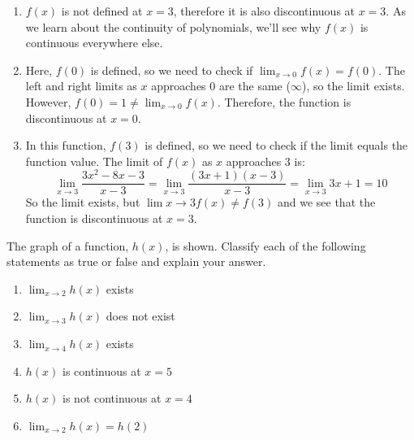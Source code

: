 \begin{Answer}[ref=limits5]
    \begin{enumerate}
    \item $f(x)$ is not defined at $x = 3$, therefore it is also discontinuous
     at $x = 3$. As we learn about the continuity of polynomials, we'll see 
     why $f(x)$ is continuous everywhere else. 
    \item Here, $f(0)$ is defined, so we need to check if $\lim_{x \to 0}f(x) 
    = f(0)$. The left and right limits as $x$ approaches $0$ are the same 
    ($\infty$), so the limit exists. However, $f(0) = 1 \neq \lim_{x\to 0}f(x)$. 
    Therefore, the function is discontinuous at $x=0$.
    \item In this function, $f(3)$ is defined, so we need to check if the limit 
    equals the function value. The limit of $f(x)$ as $x$ approaches $3$ is: 
    $$\lim_{x \to 3}\frac{3x^2-8x-3}{x-3} = \lim_{x \to 3}
    \frac{(3x+1)(x-3)}{x-3} = \lim_{x \to 3}3x+1 = 10$$
    So the limit exists, but $\lim{x \to 3}f(x) \neq f(3)$ and we see that the 
    function is discontinuous at $x=3$.
	\end{enumerate}
\end{Answer}

\begin{Exercise}[label=limits6]
	The graph of a function, $h(x)$, is shown. Classify each of the following 
	statements as true or false and explain your answer. 
	\\
	\begin{enumerate}
	\item $\lim_{x\to2} h(x)$ exists
	\item $\lim_{x \to 3} h(x)$ does not exist
	\item $\lim_{x \to 4} h(x)$ exists
	\item $h(x)$ is continuous at $x=5$
	\item $h(x)$ is not continuous at $x=4$
	\item $\lim_{x \to 2} h(x) = h(2)$
	\end{enumerate}
\end{Exercise}

